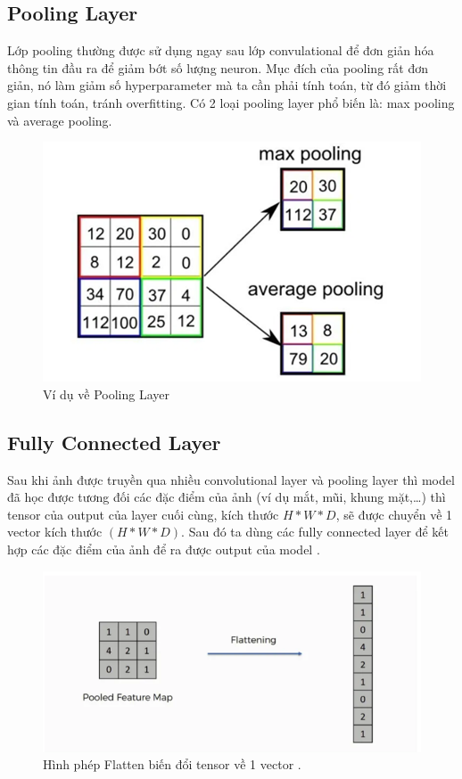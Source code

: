 \subsection{Pooling Layer}
Lớp pooling thường được sử dụng ngay sau lớp convulational để đơn giản hóa thông tin đầu ra để giảm bớt số lượng neuron. Mục đích của pooling rất đơn giản, nó làm giảm số hyperparameter mà ta cần phải tính toán, từ đó giảm thời gian tính toán, tránh overfitting. Có 2 loại pooling layer phổ biến là: max pooling và average pooling.\par
\begin{figure}[ht!]
\centerline{\includegraphics[scale=0.7]{images/neural7.png}}
\caption{Ví dụ về Pooling Layer \cite{ntt:2019}}
\label{fig:neural7}
\end{figure}
\subsection{Fully Connected Layer}
Sau khi ảnh được truyền qua nhiều convolutional layer và pooling layer thì model đã học được tương đối các đặc điểm của ảnh (ví dụ mắt, mũi, khung mặt,…) thì tensor của output của layer cuối cùng, kích thước $H*W*D$, sẽ được chuyển về 1 vector kích thước $(H*W*D)$. Sau đó ta dùng các fully connected layer để kết hợp các đặc điểm của ảnh để ra được output của model \cite{ntt:2019}.\par
\begin{figure}[ht!]
\centerline{\includegraphics[scale=0.7]{images/neural8.png}}
\caption{Hình phép Flatten biến đổi tensor về 1 vector \cite{ntt:2019}.}
\label{fig:neural8}
\end{figure}

